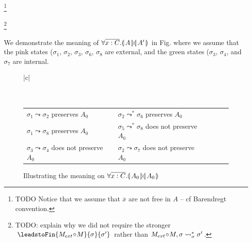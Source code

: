 \footnote{{TODO Notice that we assume that $\overline x$ are not free in $A$ -- cf Barendregt convention.}}

\footnote{TODO: explain why we did not require the stronger $\leadstoFin{M_{ext}\!\circ \!M}{\sigma}{\sigma'}$ rather than $M_{ext}\!\circ \!M, \sigma \leadsto^*_{\sigma} \sigma'$.}



{We demonstrate the meaning of ${\forall {\overline {x:C}}.{\llparenthesis}\, A \,{\rrparenthesis}{\llparenthesis}\, A' \,{\rrparenthesis}}$ in Fig. where we assume that the pink states (\ie   ${\sigma_1}$, 
 ${\sigma_2}$,  ${\sigma_3}$,  ${\sigma_6}$,  ${\sigma_8}$ are external, and the green states (\ie   ${\sigma_3}$, 
 ${\sigma_4}$,  and ${\sigma_7}$ are internal.}
 
 \begin{figure}[htb]
\begin{tabular}{|c|}
\hline \\
\\
\hline
\\
\begin{tabular}{lclclcl} 
$ {\sigma_1} \leadsto  \sigma_2 $ preserves $A_0$ & &
$ {\sigma_2} \leadsto^*  \sigma_6 $ preserves $A_0$ \\
$ {\sigma_1} \leadsto  \sigma_8 $ preserves $A_0$ & &
$ {\sigma_5} \leadsto^* \sigma_8 $ does not preserve $A_0$\\
$ {\sigma_3} \leadsto  \sigma_4 $ does not preserve $A_0$ & &
$ {\sigma_2} \leadsto  \sigma_7 $ does not preserve $A_0$
\\
\hline
\end{tabular}
\end{tabular}
   \caption{Illustrating  the meaning on ${\forall {\overline {x:C}}.{\llparenthesis}\, A_0 \,{\rrparenthesis}{\llparenthesis}\, A_0 \,{\rrparenthesis}}$    }
   \label{fig:TwoStateSemantics}
 \end{figure}
 
